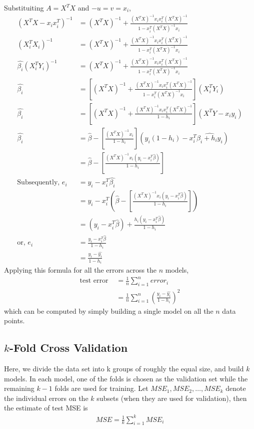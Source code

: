 \documentclass[../statistical_learning_notes.tex]{subfiles}
\begin{document}
    Substituiting $A = X^{T}X$ and $-u = v = x_{i}$,
    \begin{align*}
        (X^{T}X - x_{i}x_{i}^{T})^{-1} &= (X^{T}X)^{-1} + \frac{(X^{T}X)^{-1}x_{i}x_{i}^{T}(X^{T}X)^{-1}}{1-x_{i}^{T}(X^{T}X)^{-1}x_{i}}\\
        (X_{i}^{T}X_{i})^{-1} &= (X^{T}X)^{-1} + \frac{(X^{T}X)^{-1}x_{i}x_{i}^{T}(X^{T}X)^{-1}}{1-x_{i}^{T}(X^{T}X)^{-1}x_{i}}\\
        \hat{\beta_{i}}(X_{i}^{T}Y_{i})^{-1} &= (X^{T}X)^{-1} + \frac{(X^{T}X)^{-1}x_{i}x_{i}^{T}(X^{T}X)^{-1}}{1-x_{i}^{T}(X^{T}X)^{-1}x_{i}}\\
        \hat{\beta_{i}} &= [(X^{T}X)^{-1} + \frac{(X^{T}X)^{-1}x_{i}x_{i}^{T}(X^{T}X)^{-1}}{1-x_{i}^{T}(X^{T}X)^{-1}x_{i}}](X_{i}^{T}Y_{i})\\
        \hat{\beta_{i}} &= [(X^{T}X)^{-1} + \frac{(X^{T}X)^{-1}x_{i}x_{i}^{T}(X^{T}X)^{-1}}{1-h_{i}}](X^{T}Y - x_{i}y_{i})\\
        \hat{\beta_{i}} &= \hat{\beta} - [\frac{(X^{T}X)^{-1}x_{i}}{1-h_{i}}](y_{i}(1-h_{i})-x_{i}^{T}\hat{\beta_{i}+h_{i}y_{i}})\\
        &= \hat{\beta} - [\frac{(X^{T}X)^{-1}x_{i}(y_{i}-x_{i}^{T}\hat{\beta})}{1-h_{i}}]\\
        \text{Subsequently, } e_{i} &= y_{i} - x_{i}^{T}\hat{\beta_{i}}\\
                                &= y_{i} - x_{i}^{T}(\hat{\beta} - [\frac{(X^{T}X)^{-1}x_{i}(y_{i}-x_{i}^{T}\hat{\beta})}{1-h_{i}}])\\
                                &= (y_{i}-x_{i}^{T}\hat{\beta}) + \frac{h_{i}(y_{i}-x_{i}^{T}\hat{\beta})}{1-h_{i}}\\
            \text{or, } e_{i} &= \frac{y_{i}-x_{i}^{T}\hat{\beta}}{1-h_{i}}\\
                             &= \frac{y_{i}-\hat{y_{i}}}{1-h_{i}}
    \end{align*}
    Applying this formula for all the errors across the $n$ models,
    \begin{align*}
        \text{test error } &= \frac{1}{n}\sum_{i=1}^{n} error_{i}\\
                        &= \frac{1}{n}\sum_{i=1}^{n} (\frac{y_{i}-\hat{y_{i}}}{1-h_{i}})^{2}
    \end{align*}
    which can be computed by simply building a single model on all the $n$ data points.
    

    \subsection{$k$-Fold Cross Validation}
    Here, we divide the data set into k groups of roughly the equal size, and build $k$ models. In each model, one of the folds is chosen as the validation set while the remaining $k-1$ folds are used for training. Let $MSE_{1}, MSE_{2}, \ldots, MSE_{k}$ denote the individual errors on the $k$ subsets (when they are used for validation), then the estimate of test MSE is
    \begin{align*}
        MSE = \frac{1}{k}\sum_{i=1}^{k}MSE_{i}
    \end{align*}
\end{document}
